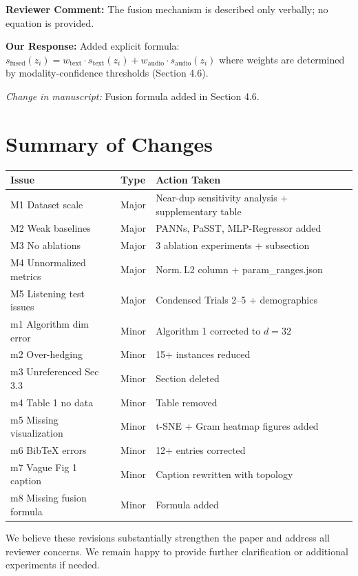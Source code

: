\documentclass[11pt]{article}
\newcommand{\reviewer}[1]{\textcolor{reviewercolor}{\textbf{Reviewer Comment:} #1}}
\newcommand{\response}[1]{\textcolor{responsecolor}{\textbf{Our Response:} #1}}
\newcommand{\change}[1]{\textit{Change in manuscript:} #1}
\begin{document}
\reviewer{The fusion mechanism is described only verbally; no equation is provided.}

\response{Added explicit formula: $s_{\text{fused}}(z_i) = w_{\text{text}} \cdot s_{\text{text}}(z_i) + w_{\text{audio}} \cdot s_{\text{audio}}(z_i)$ where weights are determined by modality-confidence thresholds (Section 4.6).}

\change{Fusion formula added in Section 4.6.}

\section*{Summary of Changes}

\begin{table}[h]
\centering
\small
\begin{tabular}{lll}
\toprule
\textbf{Issue} & \textbf{Type} & \textbf{Action Taken} \\
\midrule
M1 Dataset scale & Major & Near-dup sensitivity analysis + supplementary table \\
M2 Weak baselines & Major & PANNs, PaSST, MLP-Regressor added \\
M3 No ablations & Major & 3 ablation experiments + subsection \\
M4 Unnormalized metrics & Major & Norm.\,L2 column + param\_ranges.json \\
M5 Listening test issues & Major & Condensed Trials 2--5 + demographics \\
m1 Algorithm dim error & Minor & Algorithm 1 corrected to $d{=}32$ \\
m2 Over-hedging & Minor & 15+ instances reduced \\
m3 Unreferenced Sec 3.3 & Minor & Section deleted \\
m4 Table 1 no data & Minor & Table removed \\
m5 Missing visualization & Minor & t-SNE + Gram heatmap figures added \\
m6 BibTeX errors & Minor & 12+ entries corrected \\
m7 Vague Fig 1 caption & Minor & Caption rewritten with topology \\
m8 Missing fusion formula & Minor & Formula added \\
\bottomrule
\end{tabular}
\end{table}

We believe these revisions substantially strengthen the paper and address all reviewer concerns. We remain happy to provide further clarification or additional experiments if needed.
\end{document}
